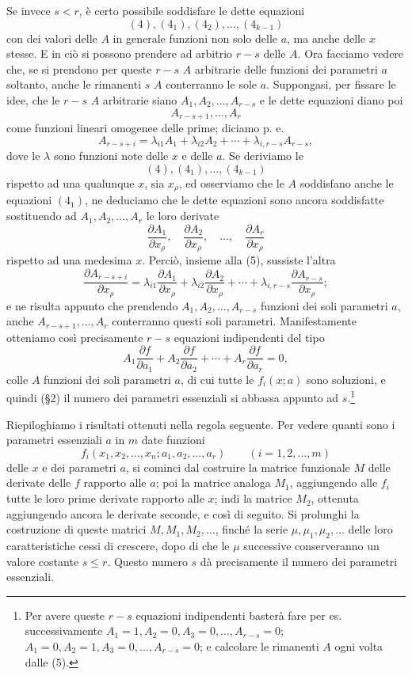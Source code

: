 \documentclass[11pt]{book}
\begin{document}
Se invece $s<r$, è certo possibile soddisfare le dette equazioni
\[
 (4),(4_1),(4_2),\ldots,(4_{k-1})
\]
con dei valori delle $A$ in generale funzioni non solo delle $a$, ma anche delle $x$ stesse. E in ciò si possono prendere ad arbitrio $r-s$ delle $A$. Ora facciamo vedere che, se si prendono per queste $r-s$ $A$ arbitrarie delle funzioni dei parametri $a$ soltanto, anche le rimanenti $s$ $A$ conterranno le sole $a$. Suppongasi, per fissare le idee, che le $r-s$ $A$ arbitrarie siano $A_1,A_2,\ldots,A_{r-s}$ e le dette equazioni diano poi
\[
 A_{r-s+1},\ldots,A_r
\]
come funzioni lineari omogenee delle prime; diciamo p. e.
\begin{equation*}\tag{5}
 A_{r-s+i}=\lambda_{i1}A_1+\lambda_{i2}A_2+\cdots+\lambda_{i,r-s}A_{r-s},
\end{equation*}
dove le $\lambda$ sono funzioni note delle $x$ e delle $a$. Se deriviamo le
\[
 (4),(4_1),\ldots,(4_{k-1})
\]
rispetto ad una qualunque $x$, sia $x_\rho$, ed osserviamo che le $A$ soddisfano anche le equazioni $(4_1)$, ne deduciamo che le dette equazioni sono ancora soddisfatte sostituendo ad $A_1,A_2,\ldots,A_r$ le loro derivate
\[
 \frac{\partial A_1}{\partial x_\rho},\quad
 \frac{\partial A_2}{\partial x_\rho},\quad\ldots,\quad
 \frac{\partial A_r}{\partial x_\rho}
\]
rispetto ad una medesima $x$. Perciò, insieme alla (5), sussiste l'altra
\[
 \frac{\partial A_{r-s+i}}{\partial x_\rho}=\lambda_{i1}\frac{\partial A_1}{\partial x_\rho}+\lambda_{i2}\frac{\partial A_2}{\partial x_\rho}+\cdots+\lambda_{i,r-s}\frac{\partial A_{r-s}}{\partial x_\rho};
\]
e ne risulta appunto che prendendo $A_1,A_2,\ldots,A_{r-s}$ funzioni dei soli parametri $a$, anche $A_{r-s+1},\ldots,A_r$ conterranno questi soli parametri. Manifestamente otteniamo così precisamente $r-s$ equazioni indipendenti del tipo
\[
 A_1\frac{\partial f}{\partial a_1}+A_2\frac{\partial f}{\partial a_2}+\cdots+A_r\frac{\partial f}{\partial a_r}=0,\tag{*}
\]
colle $A$ funzioni dei soli parametri $a$, di cui tutte le $f_i(x;a)$ sono soluzioni, e quindi (\S{}2) il numero dei parametri essenziali si abbassa appunto ad $s$.\footnote{Per avere queste $r-s$ equazioni indipendenti basterà fare per es. successivamente $A_1=1,A_2=0,A_3=0,\ldots,A_{r-s}=0$; $A_1=0,A_2=1,A_3=0,\ldots,A_{r-s}=0$; e calcolare le rimanenti $A$ ogni volta dalle (5).}

Riepiloghiamo i risultati ottenuti nella regola seguente. Per vedere quanti sono i parametri essenziali $a$ in $m$ date funzioni
\[
 f_i(x_1,x_2,\ldots,x_n;a_1,a_2,\ldots,a_r)\qquad (i=1,2,\ldots,m)
\]
delle $x$ e dei parametri $a$, si cominci dal costruire la matrice funzionale $M$ delle derivate delle $f$ rapporto alle $a$; poi la matrice analoga $M_1$, aggiungendo alle $f_i$ tutte le loro prime derivate rapporto alle $x$; indi la matrice $M_2$, ottenuta aggiungendo ancora le derivate seconde, e così di seguito. Si prolunghi la costruzione di queste matrici $M,M_1,M_2,\ldots$, finché la serie $\mu,\mu_1,\mu_2,\ldots$ delle loro caratteristiche cessi di crescere, dopo di che le $\mu$ successive conserveranno un valore costante $s\le r$. Questo numero $s$ dà precisamente il numero dei parametri essenziali.
\end{document}
